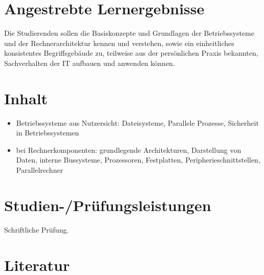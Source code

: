 \section*{Angestrebte
Lernergebnisse\label{/mi-2017/modulbeschreibungen-bachelor/BA_EinfhrunginBetriebssystemeundRechnerarchitektur}}\label{angestrebte-lernergebnissepathlabelmi-2017modulbeschreibungen-bachelorbaux5feinfhrunginbetriebssystemeundrechnerarchitektur}

Die Studierenden sollen die Basiskonzepte und Grundlagen der
Betriebssysteme und der Rechnerarchitektur kennen und verstehen, sowie
ein einheitliches konsistentes Begriffsgebäude zu, teilweise aus der
persönlichen Praxis bekannten, Sachverhalten der IT aufbauen und
anwenden können.

\section*{Inhalt\label{/mi-2017/modulbeschreibungen-bachelor/BA_EinfhrunginBetriebssystemeundRechnerarchitektur}}\label{inhaltpathlabelmi-2017modulbeschreibungen-bachelorbaux5feinfhrunginbetriebssystemeundrechnerarchitektur}

\begin{itemize}
\tightlist
\item
  Betriebssysteme aus Nutzersicht: Dateisysteme, Parallele Prozesse,
  Sicherheit in Betriebssystemen
\item
  bei Rechnerkomponenten: grundlegende Architekturen, Darstellung von
  Daten, interne Bussysteme, Prozessoren, Festplatten,
  Peripherieschnittstellen, Parallelrechner
\end{itemize}

\section*{Studien-/Prüfungsleistungen\label{/mi-2017/modulbeschreibungen-bachelor/BA_EinfhrunginBetriebssystemeundRechnerarchitektur}}\label{studien-pruxfcfungsleistungenpathlabelmi-2017modulbeschreibungen-bachelorbaux5feinfhrunginbetriebssystemeundrechnerarchitektur}

Schriftliche Prüfung.

\section*{Literatur\label{/mi-2017/modulbeschreibungen-bachelor/BA_EinfhrunginBetriebssystemeundRechnerarchitektur}}\label{literaturpathlabelmi-2017modulbeschreibungen-bachelorbaux5feinfhrunginbetriebssystemeundrechnerarchitektur}

